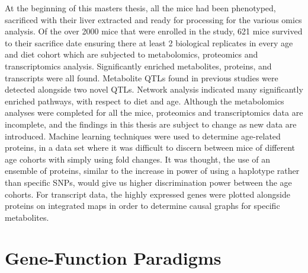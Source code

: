 \documentclass[a4paper,11pt,twoside]{book}
\begin{document}
    At the beginning of this masters thesis, all the mice had been phenotyped, sacrificed with their liver extracted and ready for processing for the various omics analysis. Of the over 2000 mice that were enrolled in the study, 621 mice survived to their sacrifice date ensuring there at least 2 biological replicates in every age and diet cohort which are subjected to metabolomics, proteomics and transcriptomics analysis. Significantly enriched metabolites, proteins, and transcripts were all found. Metabolite QTLs found in previous studies were detected alongside two novel QTLs. Network analysis indicated many significantly enriched pathways, with respect to diet and age. Although the metabolomics analyses were completed for all the mice, proteomics and transcriptomics data are incomplete, and the findings in this thesis are subject to change as new data are introduced. Machine learning techniques were used to determine age-related proteins, in a data set where it was difficult to discern between mice of different age cohorts with simply using fold changes. It was thought, the use of an ensemble of proteins, similar to the increase in power of using a haplotype rather than specific SNPs, would give us higher discrimination power between the age cohorts\citep{Lorenz2010Performancebarley}. For transcript data, the highly expressed genes were plotted alongside proteins on integrated maps in order to determine causal graphs for specific metabolites.
	
	\section{Gene-Function Paradigms}
	
\end{document}
